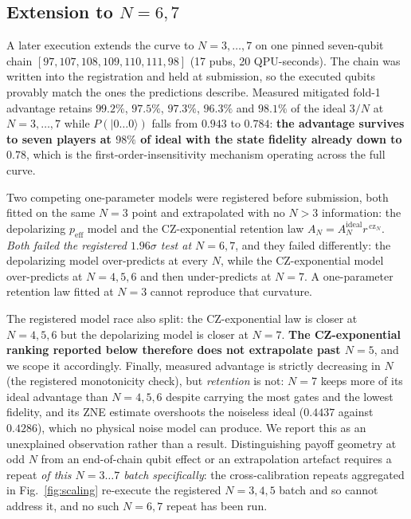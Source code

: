 \documentclass[conference]{IEEEtran}
\newcommand{\ket}[1]{\ensuremath{|#1\rangle}}
\begin{document}
\subsection{Extension to $N=6,7$}\label{sec:n67}
A later execution extends the curve to $N=3,\ldots,7$ on one pinned seven-qubit
chain $[97,107,108,109,110,111,98]$ (17 pubs, 20 QPU-seconds). The chain was
written into the registration and held at submission, so the executed qubits
provably match the ones the predictions describe. Measured mitigated fold-1
advantage retains $99.2\%$, $97.5\%$, $97.3\%$, $96.3\%$ and $98.1\%$ of the
ideal $3/N$ at $N=3,\ldots,7$ while $P(\ket{0\ldots0})$ falls from $0.943$ to
$0.784$: \textbf{the advantage survives to seven players at $98\%$ of ideal
with the state fidelity already down to $0.78$}, which is the
first-order-insensitivity mechanism operating across the full curve.

Two competing one-parameter models were registered before submission, both
fitted on the same $N{=}3$ point and extrapolated with no $N>3$ information: the
depolarizing $p_{\mathrm{eff}}$ model and the CZ-exponential retention law
$A_N = A^{\mathrm{ideal}}_N r^{\,\mathrm{cz}_N}$. \emph{Both failed the
registered $1.96\sigma$ test at $N=6,7$}, and they failed differently: the
depolarizing model over-predicts at every $N$, while the CZ-exponential model
over-predicts at $N=4,5,6$ and then under-predicts at $N=7$. A one-parameter
retention law fitted at $N{=}3$ cannot reproduce that curvature.

The registered model race also split: the CZ-exponential law is closer at
$N=4,5,6$ but the depolarizing model is closer at $N=7$. \textbf{The
CZ-exponential ranking reported below therefore does not extrapolate past
$N{=}5$}, and we scope it accordingly. Finally, measured advantage is strictly
decreasing in $N$ (the registered monotonicity check), but \emph{retention} is
not: $N{=}7$ keeps more of its ideal advantage than $N=4,5,6$ despite carrying
the most gates and the lowest fidelity, and its ZNE estimate overshoots the
noiseless ideal ($0.4437$ against $0.4286$), which no physical noise model can
produce. We report this as an unexplained observation rather than a result.
Distinguishing payoff geometry at odd $N$ from an end-of-chain qubit effect or
an extrapolation artefact requires a repeat \emph{of this $N=3\ldots7$ batch
specifically}: the cross-calibration repeats aggregated in
Fig.~\ref{fig:scaling} re-execute the registered $N=3,4,5$ batch and so cannot
address it, and no such $N=6,7$ repeat has been run.
\end{document}
